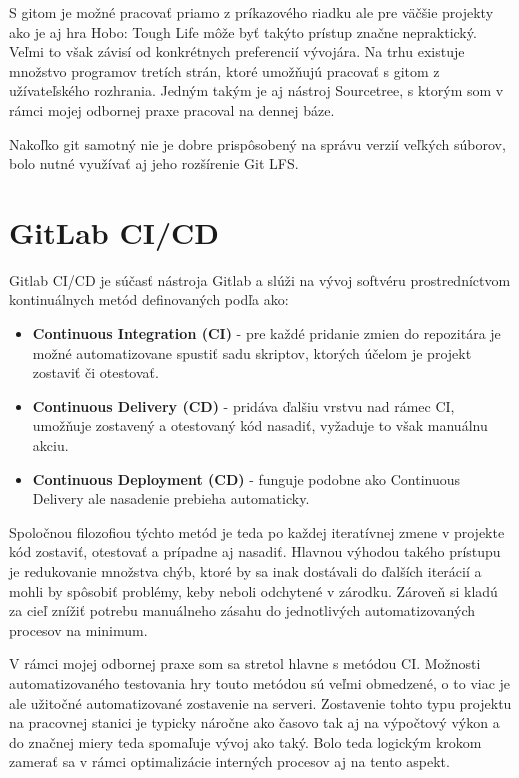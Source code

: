 \documentclass[slovak, bachelorpractice]{diploma}
\begin{document}
S gitom je možné pracovať priamo z príkazového riadku ale pre väčšie projekty ako je aj hra Hobo: Tough Life môže byť takýto prístup značne nepraktický. Veľmi to však závisí od konkrétnych preferencií vývojára. Na trhu existuje množstvo programov tretích strán, ktoré umožňujú pracovať s gitom z užívateľského rozhrania. Jedným takým je aj nástroj Sourcetree, s ktorým som v rámci mojej odbornej praxe pracoval na dennej báze.

Nakoľko git samotný nie je dobre prispôsobený na správu verzií veľkých súborov, bolo nutné využívať aj jeho rozšírenie Git LFS. 
\section{GitLab CI/CD}
\label{sec:GitLab}
Gitlab CI/CD je súčasť nástroja Gitlab a slúži na vývoj softvéru prostredníctvom kontinuálnych metód definovaných podľa \cite{Cicd} ako:
\begin{itemize}
  \item \textbf{Continuous Integration (CI)} - pre každé pridanie zmien do repozitára je možné automatizovane spustiť sadu skriptov, ktorých účelom je projekt zostaviť či otestovať.
  \item \textbf{Continuous Delivery (CD)} - pridáva ďalšiu vrstvu nad rámec CI, umožňuje zostavený a otestovaný kód nasadiť, vyžaduje to však manuálnu akciu.
  \item \textbf{Continuous Deployment (CD)} - funguje podobne ako Continuous Delivery ale nasadenie prebieha automaticky.
\end{itemize}
Spoločnou filozofiou týchto metód je teda po každej iteratívnej zmene v projekte kód zostaviť, otestovať a prípadne aj nasadiť. Hlavnou výhodou takého prístupu je redukovanie množstva chýb, ktoré by sa inak dostávali do ďalších iterácií a mohli by spôsobiť problémy, keby neboli odchytené v zárodku. Zároveň si kladú za cieľ znížiť potrebu manuálneho zásahu do jednotlivých automatizovaných procesov na minimum.

V rámci mojej odbornej praxe som sa stretol hlavne s metódou CI. Možnosti automatizovaného testovania hry touto metódou sú veľmi obmedzené, o to viac je ale užitočné automatizované zostavenie na serveri. Zostavenie tohto typu projektu na pracovnej stanici je typicky náročne ako časovo tak aj na výpočtový výkon a do značnej miery teda spomaľuje vývoj ako taký. Bolo teda logickým krokom zamerať sa v rámci optimalizácie interných procesov aj na tento aspekt.
\end{document}
